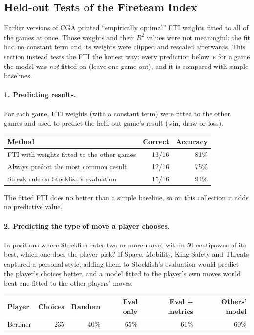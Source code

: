 \documentclass[11pt]{book}
\begin{document}
\subsection{Held-out Tests of the Fireteam Index}

Earlier versions of CGA printed ``empirically optimal'' FTI weights fitted to all of the games at once. Those weights and their $R^2$ values were not meaningful: the fit had no constant term and its weights were clipped and rescaled afterwards. This section instead tests the FTI the honest way: every prediction below is for a game the model was \emph{not} fitted on (leave-one-game-out), and it is compared with simple baselines.

\paragraph{1. Predicting results.}
For each game, FTI weights (with a constant term) were fitted to the other games and used to predict the held-out game's result (win, draw or loss).

\begin{center}
\begin{tabular}{lrr}
\toprule
\textbf{Method} & \textbf{Correct} & \textbf{Accuracy} \\
\midrule
FTI with weights fitted to the other games & 13/16 & 81\% \\
Always predict the most common result & 12/16 & 75\% \\
Streak rule on Stockfish's evaluation & 15/16 & 94\% \\
\bottomrule
\end{tabular}
\end{center}

The fitted FTI does no better than a simple baseline, so on this collection it adds no predictive value.

\paragraph{2. Predicting the type of move a player chooses.}
In positions where Stockfish rates two or more moves within 50 centipawns of its best, which one does the player pick? If Space, Mobility, King Safety and Threats captured a personal style, adding them to Stockfish's evaluation would predict the player's choices better, and a model fitted to the player's own moves would beat one fitted to the other players' moves.

\begin{center}
\begin{tabular}{lrrrrr}
\toprule
\textbf{Player} & \textbf{Choices} & \textbf{Random} & \textbf{Eval only} & \textbf{Eval + metrics} & \textbf{Others' model} \\
\midrule
Berliner & 235 & 40\% & 65\% & 61\% & 60\% \\
\bottomrule
\end{tabular}
\end{center}
\end{document}
